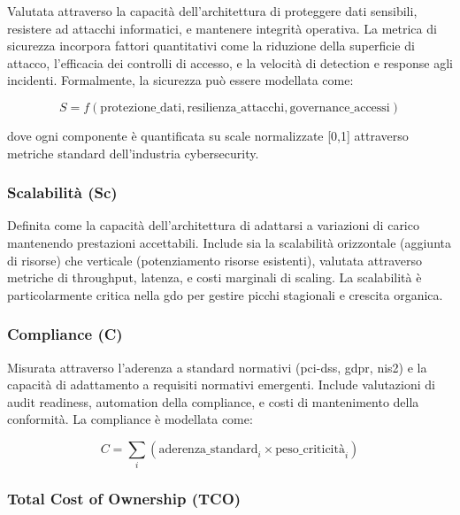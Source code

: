 Valutata attraverso la capacità dell'architettura di proteggere dati sensibili, resistere ad attacchi informatici, e mantenere integrità operativa. La metrica di sicurezza incorpora fattori quantitativi come la riduzione della superficie di attacco, l'efficacia dei controlli di accesso, e la velocità di detection e response agli incidenti. Formalmente, la sicurezza può essere modellata come:

\begin{equation}
S = f(\text{protezione\_dati}, \text{resilienza\_attacchi}, \text{governance\_accessi})
\label{eq:sicurezza}
\end{equation}

dove ogni componente è quantificata su scale normalizzate [0,1] attraverso metriche standard dell'industria cybersecurity.

\subsubsection{Scalabilità (Sc)}

Definita come la capacità dell'architettura di adattarsi a variazioni di carico mantenendo prestazioni accettabili. Include sia la scalabilità orizzontale (aggiunta di risorse) che verticale (potenziamento risorse esistenti), valutata attraverso metriche di throughput, latenza, e costi marginali di scaling. La scalabilità è particolarmente critica nella \gls{gdo} per gestire picchi stagionali e crescita organica.

\subsubsection{Compliance (C)}

Misurata attraverso l'aderenza a standard normativi (\gls{pci-dss}, \gls{gdpr}, \gls{nis2}) e la capacità di adattamento a requisiti normativi emergenti. Include valutazioni di audit readiness, automation della compliance, e costi di mantenimento della conformità. La compliance è modellata come:

\begin{equation}
C = \sum_{i} (\text{aderenza\_standard}_i \times \text{peso\_criticità}_i)
\label{eq:compliance}
\end{equation}

\subsubsection{Total Cost of Ownership (TCO)}

